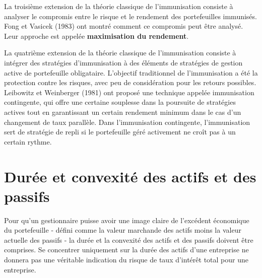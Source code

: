 \documentclass[12pt]{article}
\begin{document}
\vspace{0.5cm}

La troisième extension de la théorie classique de l'immunisation consiste à analyser le compromis entre le risque et le rendement des portefeuilles immunisés. Fong et Vasicek (1983) ont montré comment ce compromis peut être analysé. Leur approche est appelée \textbf{maximisation du rendement}.

\vspace{0.5cm}

La quatrième extension de la théorie classique de l'immunisation consiste à intégrer des stratégies d'immunisation à des éléments de stratégies de gestion active de portefeuille obligataire. L'objectif traditionnel de l'immunisation a été la protection contre les risques, avec peu de considération pour les retours possibles. Leibowitz et Weinberger (1981) ont proposé une technique appelée immunisation contingente, qui offre une certaine souplesse dans la poursuite de stratégies actives tout en garantissant un certain rendement minimum dans le cas d'un changement de taux parallèle. Dans l'immunisation contingente, l'immunisation sert de stratégie de repli si le portefeuille géré activement ne croît pas à un certain rythme.

\section{Durée et convexité des actifs et des passifs}
Pour qu'un gestionnaire puisse avoir une image claire de l'excédent économique du portefeuille - défini comme la valeur marchande des actifs moins la valeur actuelle des passifs - la durée et la convexité des actifs et des passifs doivent être comprises. Se concentrer uniquement sur la durée des actifs d’une entreprise ne donnera pas une véritable indication du risque de taux d’intérêt total pour une entreprise.
\end{document}
